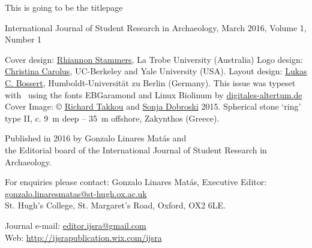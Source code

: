 	\begin{titlepage}
		
		This is going to be the titlepage
	\end{titlepage}	
\thispagestyle{empty}
\hfill
\vfill

\begin{footnotesize}
\noindent International Journal of Student Research in Archaeology,\newline
March 2016, Volume 1, Number 1\\
\vspace{2em}


\noindent Cover design: \href{https://latrobe.academia.edu/RhiannonStammers}{Rhiannon Stammers}, La Trobe University (Australia)\newline
\noindent Logo design: \href{hraf.yale.edu/about/staff/christina-carolus/}{Christina Carolus}, UC-Berkeley and Yale University (USA).\newline
\noindent Layout design: \href{https://hu-berlin.academia.edu/LukasCBossert}{Lukas C. Bossert}, Humboldt-Universität zu Berlin (Germany). \newline \indent This issue was typeset with \XeLaTeX\ using the fonts EBGaramond and {\sffamily Linux Biolinum} by \href{www.digitales-altertum.de}{digitales-altertum.de} \\
Cover Image: © \href{https://oxford.academia.edu/RichardTakkou}{Richard Takkou} and \href{https://st-andrews.academia.edu/SonjaDobroski}{Sonja Dobroski} 2015.\newline
\indent Spherical stone ‘ring’ type II, c. \SI{9}{\meter} deep – \SI{35}{\meter} offshore, Zakynthos (Greece). 
\vspace{2em}

\noindent Published in 2016 by Gonzalo Linares Matás and \\ the Editorial board of the International Journal of Student Research in Archaeology. 




\vspace{2em}






\noindent For enquiries please contact: Gonzalo Linares Matás, Executive Editor:\\ \href{mailto:gonzalo.linaresmatas@st-hugh.ox.ac.uk}{gonzalo.linaresmatas@st-hugh.ox.ac.uk}\\  St. Hugh’s College, St. Margaret’s Road, Oxford, OX2 6LE.

\noindent Journal e-mail: \href{mailto:editor.ijsra@gmail.com}{editor.ijsra@gmail.com}\\
\noindent Web: \href{http://ijsrapublication.wix.com/ijsra}{http://ijsrapublication.wix.com/ijsra}


\end{footnotesize}
